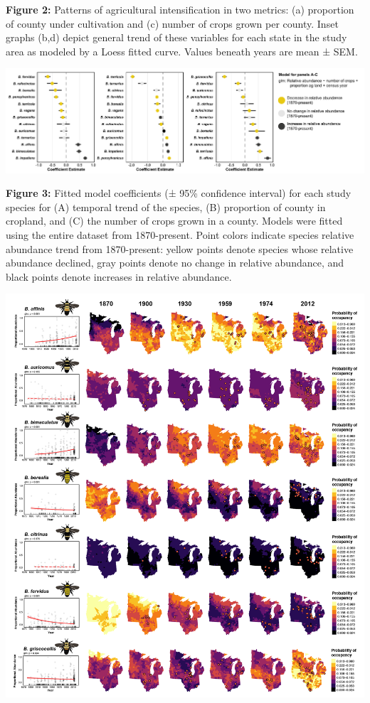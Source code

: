 \documentclass[11pt,]{article}
\begin{document}
\textbf{Figure 2:} Patterns of agricultural intensification in two
metrics: (a) proportion of county under cultivation and (c) number of
crops grown per county. Inset graphs (b,d) depict general trend of these
variables for each state in the study area as modeled by a Loess fitted
curve. Values beneath years are mean ± SEM.

\clearpage

\newpage

\includegraphics[width=1\textwidth,height=\textheight]{../ms_figs/fig3.png}

\textbf{Figure 3:} Fitted model coefficients (± 95\% confidence
interval) for each study species for (A) temporal trend of the species,
(B) proportion of county in cropland, and (C) the number of crops grown
in a county. Models were fitted using the entire dataset from
1870-present. Point colors indicate species relative abundance trend
from 1870-present: yellow points denote species whose relative abundance
declined, gray points denote no change in relative abundance, and black
points denote increases in relative abundance.

\clearpage

\newpage

\includegraphics[width=1\textwidth,height=\textheight]{../ms_figs/fig4a.png}
\end{document}
